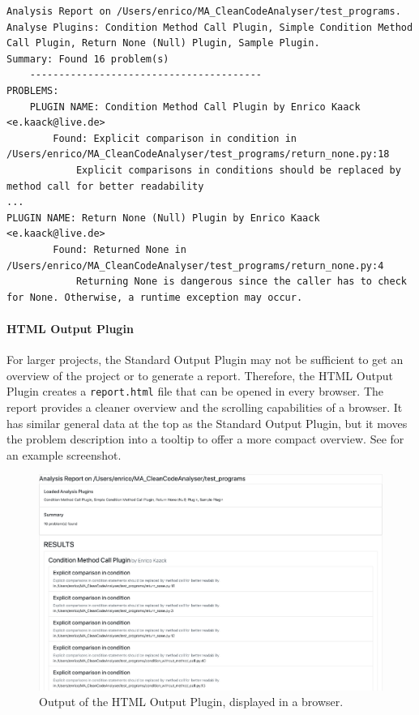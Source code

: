 \begin{lstlisting}[float, floatplacement=h, label=lst:stdout, caption={Example output to \texttt{stdout} of the Standard Output Plugin. Besides a list of problems, it also outputs additional }]
Analysis Report on /Users/enrico/MA_CleanCodeAnalyser/test_programs.
Analyse Plugins: Condition Method Call Plugin, Simple Condition Method Call Plugin, Return None (Null) Plugin, Sample Plugin.
Summary: Found 16 problem(s)
    ----------------------------------------
PROBLEMS:
    PLUGIN NAME: Condition Method Call Plugin by Enrico Kaack <e.kaack@live.de>
        Found: Explicit comparison in condition in /Users/enrico/MA_CleanCodeAnalyser/test_programs/return_none.py:18
            Explicit comparisons in conditions should be replaced by method call for better readability
...
PLUGIN NAME: Return None (Null) Plugin by Enrico Kaack <e.kaack@live.de>
        Found: Returned None in /Users/enrico/MA_CleanCodeAnalyser/test_programs/return_none.py:4
            Returning None is dangerous since the caller has to check for None. Otherwise, a runtime exception may occur.
\end{lstlisting} 

\paragraph{HTML Output Plugin}
For larger projects, the Standard Output Plugin may not be sufficient to get an overview of the project or to generate a report. Therefore, the HTML Output Plugin creates a \texttt{report.html} file that can be opened in every browser. The report provides a cleaner overview and the scrolling capabilities of a browser. It has similar general data at the top as the Standard Output Plugin, but it moves the problem description into a tooltip to offer a more compact overview. See  for an example screenshot.

\begin{figure}
    \includegraphics[width=1\textwidth]{img/CCAP/screenshot_html_output.png}
    \caption{Output of the HTML Output Plugin, displayed in a browser.}
    \label{fig:screen_html_output}
\end{figure}

